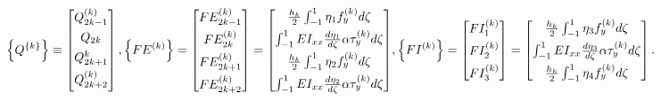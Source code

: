 \documentclass{AeroStructure-ERJohnson}
\begin{document}
\begin{align}\label{eq17.97}
\left\{Q^{\{k\}}\right\}
\equiv
\left[\begin{array}{@{}c@{}}
Q_{2 k-1}^{(k)} \\[4pt]
Q_{2 k} \\[4pt]
Q_{2 k+1}^{k} \\[4pt]
Q_{2 k+2}^{(k)} \\[4pt]
\end{array}\right],
\left\{F E^{(k)}\right\}
=
\left[\begin{array}{@{}c@{}}
F E_{2 k-1}^{(k)} \\[4pt]
F E_{2 k}^{(k)} \\[4pt]
F E_{2 k+1}^{(k)} \\[4pt]
F E_{2 k+2}^{(k)}
\end{array}\right]
=
\left[
\begin{array}{@{}c@{}}
\frac{h_{k}}{2} \int^1_{-1}\eta_{1} f_{y}^{(k)} d\zeta \\[4pt]
\int^1_{-1} E I_{x x} \frac{d \eta_{1}}{d \zeta} \alpha \tau_{y}^{(k)} d \zeta \\[4pt]
\frac{h_{k}}{2} \int^1_{-1} \eta_{2} f_{y}^{(k)} d \zeta \\[4pt]
\int^1_{-1} E I_{x x} \frac{d \eta_{2}}{d \zeta} \alpha \tau_{y}^{(k)} d \zeta
\end{array}
\right]\!,
\left\{F I^{(k)}\right\}
=\left[\begin{array}{@{}c@{}}
F I_{1}^{(k)} \\[4pt]
F I_{2}^{(k)} \\[4pt]
F I_{3}^{(k)}
\end{array}\right]
=
\left[\begin{array}{@{}c@{}}
\frac{h_{k}}{2} \int^1_{-1} \eta_{3} f_{y}^{(k)} d \zeta \\[4pt]
\int^1_{-1} E I_{x x} \frac{d \eta_{3}}{d \zeta} \alpha \tau_{y}^{(k)} d \zeta\\[4pt]
\frac{h_{k}}{2} \int^1_{-1} \eta_{4} f_{y}^{(k)} d \zeta\end{array}\right].
\end{align}
\end{document}
